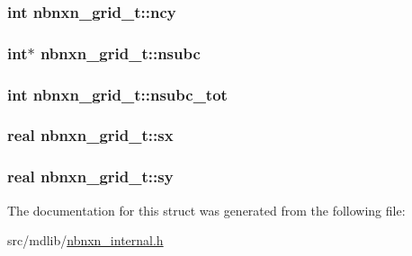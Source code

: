 \hypertarget{structnbnxn__grid__t_a9aaa1cccebc128e4840c3ae9313677ff}{
\subsubsection[{ncy}]{\setlength{\rightskip}{0pt plus 5cm}int {\bf nbnxn\-\_\-grid\-\_\-t\-::ncy}}}\label{structnbnxn__grid__t_a9aaa1cccebc128e4840c3ae9313677ff}
\hypertarget{structnbnxn__grid__t_a7c69e89ccc0c935a8739e542fd510ae9}{
\subsubsection[{nsubc}]{\setlength{\rightskip}{0pt plus 5cm}int$\ast$ {\bf nbnxn\-\_\-grid\-\_\-t\-::nsubc}}}\label{structnbnxn__grid__t_a7c69e89ccc0c935a8739e542fd510ae9}
\hypertarget{structnbnxn__grid__t_ab1d8e7c066aa35966aa8114392232b9f}{
\subsubsection[{nsubc\-\_\-tot}]{\setlength{\rightskip}{0pt plus 5cm}int {\bf nbnxn\-\_\-grid\-\_\-t\-::nsubc\-\_\-tot}}}\label{structnbnxn__grid__t_ab1d8e7c066aa35966aa8114392232b9f}
\hypertarget{structnbnxn__grid__t_a05552a132887153ae67d8d4b09c7cb72}{
\subsubsection[{sx}]{\setlength{\rightskip}{0pt plus 5cm}real {\bf nbnxn\-\_\-grid\-\_\-t\-::sx}}}\label{structnbnxn__grid__t_a05552a132887153ae67d8d4b09c7cb72}
\hypertarget{structnbnxn__grid__t_a334d7bf894ffa850d2d36a573aa3f215}{
\subsubsection[{sy}]{\setlength{\rightskip}{0pt plus 5cm}real {\bf nbnxn\-\_\-grid\-\_\-t\-::sy}}}\label{structnbnxn__grid__t_a334d7bf894ffa850d2d36a573aa3f215}


\-The documentation for this struct was generated from the following file\-:\begin{DoxyCompactItemize}
\item 
src/mdlib/\hyperlink{nbnxn__internal_8h}{nbnxn\-\_\-internal.\-h}\end{DoxyCompactItemize}
